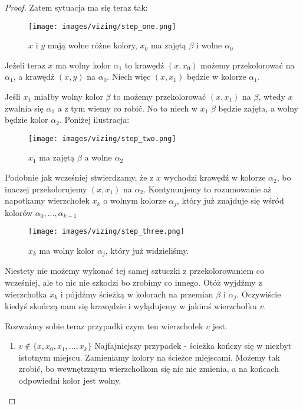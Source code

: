 \begin{proof}
	Zatem sytuacja ma się teraz tak:

	\begin{figure}[ht]
		\centering
		\texttt{[image: images/vizing/step\_one.png]}
		\caption{\(x\) i \(y\) mają wolne różne kolory, \(x_0\) ma zajętą \(\beta\) i wolne \(\alpha_0\)}
	\end{figure}

	Jeżeli teraz \(x\) ma wolny kolor \(\alpha_1\) to krawędź \((x, x_0)\)
	możemy przekolorować na \(\alpha_1\), a krawędź \((x, y)\) na \(\alpha_0\). Niech więc \((x, x_1)\) będzie w kolorze \(\alpha_1\).

	Jeśli \(x_1\) miałby wolny kolor \(\beta\) to możemy przekolorować \((x, x_1)\) na \(\beta\), wtedy \(x\) zwalnia się \(\alpha_1\) a z tym wiemy co robić.
	No to niech w \(x_1\) \(\beta\) będzie zajęta, a wolny będzie kolor \(\alpha_2\). Poniżej ilustracja:

	\begin{figure}[ht]
		\centering
		\texttt{[image: images/vizing/step\_two.png]}
		\caption{\(x_1\) ma zajętą \(\beta\) a wolne \(\alpha_2\)}
	\end{figure}

	Podobnie jak wcześniej stwierdzamy, że z \(x\) wychodzi krawędź w kolorze \(\alpha_2\), bo inaczej przekolorujemy \((x, x_1)\) na \(\alpha_2\). Kontynuujemy to rozumowanie aż napotkamy wierzchołek \(x_k\) o wolnym kolorze \(\alpha_j\), który już znajduje się wśród kolorów \(\alpha_0, ..., \alpha_{k-1}\)


	\begin{figure}[ht]
		\centering
		\texttt{[image: images/vizing/step\_three.png]}
		\caption{\(x_k\) ma wolny kolor \(\alpha_j\), który już widzieliśmy.}
	\end{figure}

	Niestety nie możemy wykonać tej samej sztuczki z przekolorowaniem co wcześniej, ale to nic nie szkodzi bo zrobimy co innego.
	Otóż wyjdźmy z wierzchołka \(x_k\) i pójdźmy ścieżką w kolorach na przemian \(\beta\) i \(\alpha_j\).
	Oczywiście kiedyś skończą nam się krawędzie i wylądujemy w jakimś wierzchołku \(v\).

	Rozważmy sobie teraz przypadki czym ten wierzchołek \(v\) jest.

	\begin{enumerate}
		\item \(v \notin \{x, x_0, x_1, ..., x_k\}\)
		      Najfajniejszy przypadek - ścieżka kończy się w niezbyt istotnym miejscu. Zamieniamy kolory na ścieżce miejscami. Możemy tak zrobić, bo wewnętrznym wierzchołkom się nic nie zmienia, a na końcach odpowiedni kolor jest wolny.


\end{enumerate}
\end{proof}
